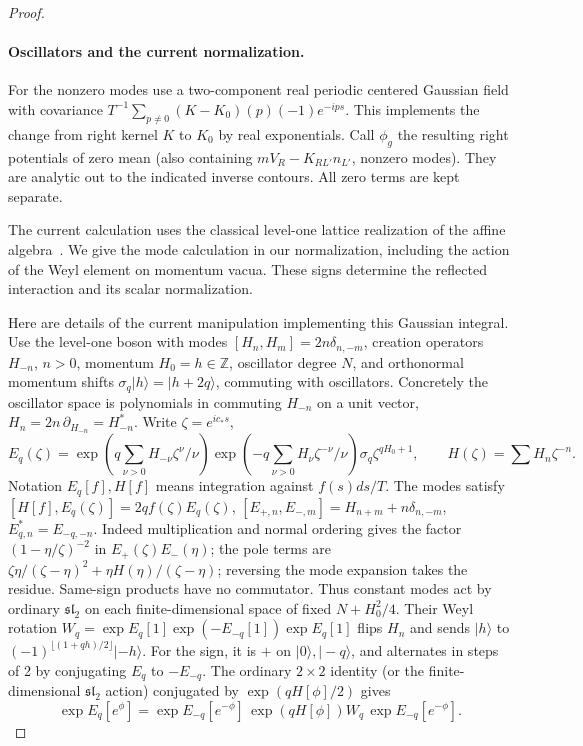 \begin{proof}
\paragraph{Oscillators and the current normalization.}
For the nonzero modes use a two-component real periodic centered Gaussian field with covariance \(T^{-1}\sum_{p\ne0}(K-K_0)(p)(-1)e^{-ips}\). This implements the change from right kernel \(K\) to \(K_0\) by real exponentials. Call \(\phi_g\) the resulting right potentials of zero mean (also containing \(m V_R-K_{RL'}n_{L'}\), nonzero modes). They are analytic out to the indicated inverse contours. All zero terms are kept separate.

The current calculation uses the classical level-one lattice realization of the affine algebra~\cite{FrenkelKac1980,Segal1981,Frenkel1985}. We give the mode calculation in our normalization, including the action of the Weyl element on momentum vacua. These signs determine the reflected interaction and its scalar normalization.

Here are details of the current manipulation implementing this Gaussian integral. Use the level-one boson with modes \([H_n,H_m]=2n\delta_{n,-m}\), creation operators \(H_{-n}\), \(n>0\), momentum \(H_0=h\in{\mathbb Z}\), oscillator degree \(N\), and orthonormal momentum shifts \(\sigma_q|h\rangle=|h+2q\rangle\), commuting with oscillators. Concretely the oscillator space is polynomials in commuting \(H_{-n}\) on a unit vector, \(H_n=2n\,\partial_{H_{-n}}=H_{-n}^*\). Write \(\zeta=e^{ic_* s}\),
\[
 E_q(\zeta)=\exp(q\sum_{\nu>0}H_{-\nu}\zeta^\nu/\nu)
             \exp(-q\sum_{\nu>0}H_\nu\zeta^{-\nu}/\nu)
             \sigma_q \zeta^{qH_0+1},\qquad H(\zeta)=\sum H_n \zeta^{-n}.
\]
Notation \(E_q[f],H[f]\) means integration against \(f(s)ds/T\). The modes satisfy \([H[f],E_q(\zeta)]=2q f(\zeta)E_q(\zeta)\),
\([E_{+,n},E_{-,m}]=H_{n+m}+n\delta_{n,-m}\), \(E_{q,n}^*=E_{-q,-n}\). Indeed multiplication and normal ordering gives the factor \((1-\eta/\zeta)^{-2}\) in \(E_+(\zeta)E_-(\eta)\); the pole terms are \(\zeta\eta/(\zeta-\eta)^2+\eta H(\eta)/(\zeta-\eta)\); reversing the mode expansion takes the residue. Same-sign products have no commutator. Thus constant modes act by ordinary \(\mathfrak{sl}_2\) on each finite-dimensional space of fixed \(N+H_0^2/4\). Their Weyl rotation \(W_q=\exp E_q[1]\exp(-E_{-q}[1])\exp E_q[1]\) flips \(H_n\) and sends \(|h\rangle\) to \((-1)^{\lfloor(1+q h)/2\rfloor}|-h\rangle\). For the sign, it is \(+\) on \(|0\rangle,|-q\rangle\), and alternates in steps of 2 by conjugating \(E_q\) to \(-E_{-q}\). The ordinary \(2\times2\) identity (or the finite-dimensional \(\mathfrak{sl}_2\) action) conjugated by \(\exp(qH[\phi]/2)\) gives
\begin{equation}
 \exp E_q[e^\phi]=\exp E_{-q}[e^{-\phi}]\,\exp(qH[\phi]) W_q\,\exp E_{-q}[e^{-\phi}].
 \label{eq:legacy-P-P1}
\end{equation}


\end{proof}
